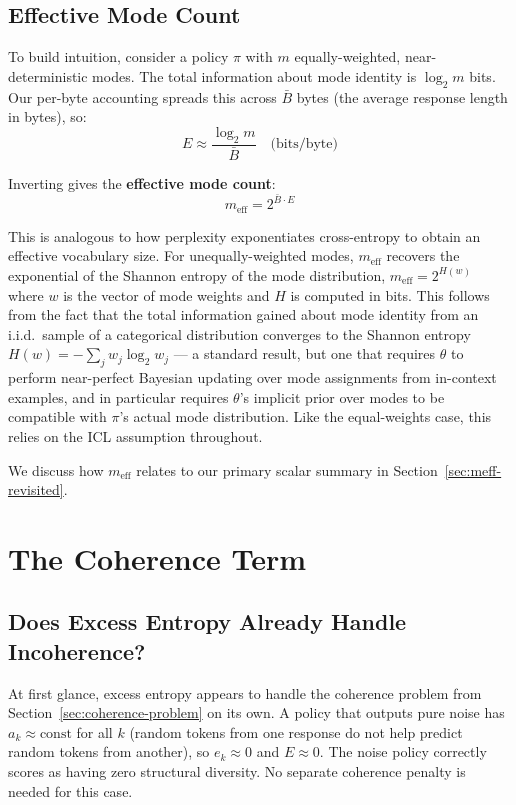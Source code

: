 \documentclass[11pt]{article}
\begin{document}
\subsection{Effective Mode Count}\label{sec:meff}

To build intuition, consider a policy $\pi$ with $m$ equally-weighted, near-deterministic modes. The total information about mode identity is $\log_2 m$ bits. Our per-byte accounting spreads this across $\bar{B}$ bytes (the average response length in bytes), so:
\begin{equation}
    E \approx \frac{\log_2 m}{\bar{B}} \quad \text{(bits/byte)}
\end{equation}

Inverting gives the \textbf{effective mode count}:
\begin{equation}\label{eq:meff}
    m_{\mathrm{eff}} = 2^{\bar{B} \cdot E}
\end{equation}

This is analogous to how perplexity exponentiates cross-entropy to obtain an effective vocabulary size. For unequally-weighted modes, $m_{\mathrm{eff}}$ recovers the exponential of the Shannon entropy of the mode distribution, $m_{\mathrm{eff}} = 2^{H(w)}$ where $w$ is the vector of mode weights and $H$ is computed in bits. This follows from the fact that the total information gained about mode identity from an i.i.d.\ sample of a categorical distribution converges to the Shannon entropy $H(w) = -\sum_j w_j \log_2 w_j$ --- a standard result, but one that requires $\theta$ to perform near-perfect Bayesian updating over mode assignments from in-context examples, and in particular requires $\theta$'s implicit prior over modes to be compatible with $\pi$'s actual mode distribution. Like the equal-weights case, this relies on the ICL assumption throughout.

We discuss how $m_{\mathrm{eff}}$ relates to our primary scalar summary in Section~\ref{sec:meff-revisited}.

\section{The Coherence Term}\label{sec:coherence}

\subsection{Does Excess Entropy Already Handle Incoherence?}

At first glance, excess entropy appears to handle the coherence problem from Section~\ref{sec:coherence-problem} on its own. A policy that outputs pure noise has $a_k \approx \mathrm{const}$ for all $k$ (random tokens from one response do not help predict random tokens from another), so $e_k \approx 0$ and $E \approx 0$. The noise policy correctly scores as having zero structural diversity. No separate coherence penalty is needed for this case.
\end{document}
